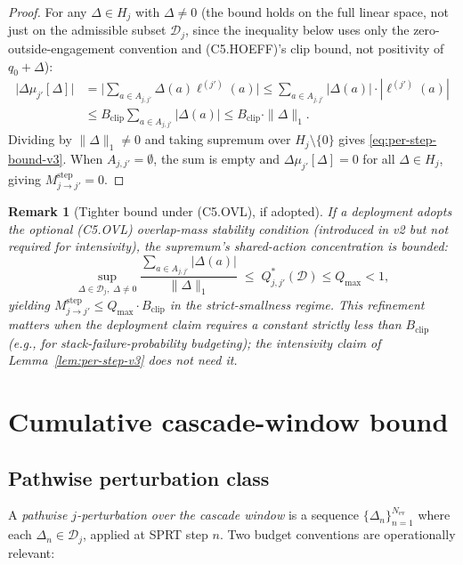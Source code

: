 \documentclass{article}
\newtheorem{remark}{Remark}
\newcommand{\Bclip}{B_{\mathrm{clip}}}
\newcommand{\Nev}{N_{\mathrm{ev}}}
\begin{document}
\begin{proof}
For any $\Delta \in H_j$ with $\Delta \neq 0$ (the bound holds on
the full linear space, not just on the admissible subset
$\mathcal{D}_j$, since the inequality below uses only the
zero-outside-engagement convention and (C5.HOEFF)'s clip bound,
not positivity of $q_0 + \Delta$):
\begin{align*}
  \big| \Delta\mu_{j'}[\Delta] \big|
  &= \big| \sum_{a \in A_{j, j'}} \Delta(a) \ell^{(j')}(a) \big|
  \leq \sum_{a \in A_{j, j'}} |\Delta(a)| \cdot |\ell^{(j')}(a)|
  \\ &\leq \Bclip \sum_{a \in A_{j, j'}} |\Delta(a)|
  \leq \Bclip \cdot \|\Delta\|_1.
\end{align*}
Dividing by $\|\Delta\|_1 \neq 0$ and taking supremum over $H_j
\setminus \{0\}$ gives \eqref{eq:per-step-bound-v3}.  When
$A_{j, j'} = \emptyset$, the sum is empty and
$\Delta\mu_{j'}[\Delta] = 0$ for all $\Delta \in H_j$, giving
$M_{j \to j'}^{\mathrm{step}} = 0$.
\end{proof}

\begin{remark}[Tighter bound under (C5.OVL), if adopted]
\label{rem:tighter-v3}
If a deployment adopts the optional (C5.OVL) overlap-mass
stability condition (introduced in v2 but \emph{not} required for
intensivity), the supremum's shared-action concentration is
bounded:
\[
  \sup_{\Delta \in \mathcal{D}_j,\; \Delta \neq 0}
  \frac{\sum_{a \in A_{j, j'}} |\Delta(a)|}{\|\Delta\|_1}
  \;\leq\; Q^*_{j, j'}(\mathcal{D}) \leq Q_{\max} < 1,
\]
yielding $M_{j \to j'}^{\mathrm{step}} \leq Q_{\max} \cdot \Bclip$
in the strict-smallness regime.  This refinement matters when the
deployment claim requires a constant strictly less than $\Bclip$
(e.g., for stack-failure-probability budgeting); the intensivity
claim of Lemma~\ref{lem:per-step-v3} does not need it.
\end{remark}

\section{Cumulative cascade-window bound}

\subsection{Pathwise perturbation class}

A \emph{pathwise $j$-perturbation over the cascade window} is a
sequence $\{\Delta_n\}_{n=1}^{\Nev}$ where each
$\Delta_n \in \mathcal{D}_j$, applied at SPRT step $n$.  Two
budget conventions are operationally relevant:
\end{document}
